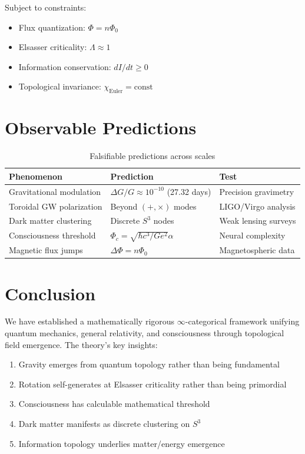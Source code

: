 \documentclass[11pt,a4paper]{article}
\begin{document}
Subject to constraints:
\begin{itemize}
\item Flux quantization: $\Phi = n\Phi_0$
\item Elsasser criticality: $\Lambda \approx 1$
\item Information conservation: $dI/dt \geq 0$
\item Topological invariance: $\chi_{\text{Euler}} = \text{const}$
\end{itemize}


\section{Observable Predictions}


\begin{table}[h]
\centering
\begin{tabular}{|l|l|l|}
\hline
\textbf{Phenomenon} & \textbf{Prediction} & \textbf{Test} \\
\hline
Gravitational modulation & $\Delta G/G \approx 10^{-10}$ (27.32 days) & Precision gravimetry \\
Toroidal GW polarization & Beyond $(+,\times)$ modes & LIGO/Virgo analysis \\
Dark matter clustering & Discrete $S^3$ nodes & Weak lensing surveys \\
Consciousness threshold & $\Phi_c = \sqrt{\hbar c^3/Ge^2}\alpha$ & Neural complexity \\
Magnetic flux jumps & $\Delta\Phi = n\Phi_0$ & Magnetospheric data \\
\hline
\end{tabular}
\caption{Falsifiable predictions across scales}
\end{table}


\section{Conclusion}


We have established a mathematically rigorous $\infty$-categorical framework unifying quantum mechanics, general relativity, and consciousness through topological field emergence. The theory's key insights:


\begin{enumerate}
\item Gravity emerges from quantum topology rather than being fundamental
\item Rotation self-generates at Elsasser criticality rather than being primordial
\item Consciousness has calculable mathematical threshold
\item Dark matter manifests as discrete clustering on $S^3$
\item Information topology underlies matter/energy emergence
\end{enumerate}
\end{document}
